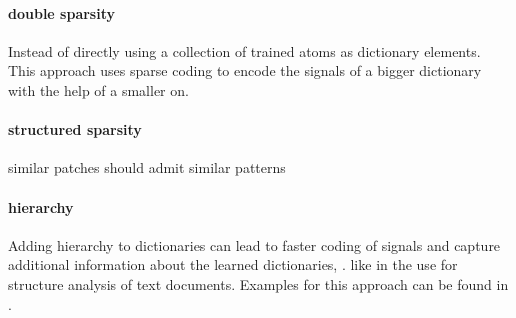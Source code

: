 \paragraph{double sparsity}
Instead of directly using a collection of trained atoms as dictionary elements. This approach uses sparse coding
to encode the signals of a bigger dictionary with the help of a smaller on. \cite{Rubinstein2009} 

\paragraph{structured sparsity}
similar patches should admit similar patterns \cite{Mairal2009}
\cite{group sparsity}

\paragraph{hierarchy}
Adding hierarchy to dictionaries can lead to faster coding of signals and capture additional information about the learned dictionaries, .
like in the use for structure analysis of text documents.  Examples for this approach can be found in \cite{Jenatton2010}.






